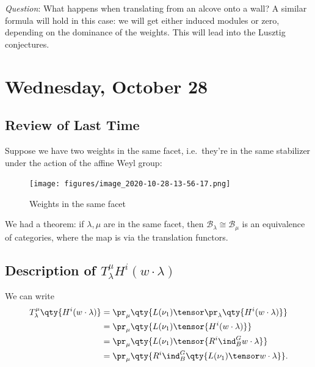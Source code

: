 \emph{Question}: What happens when translating from an alcove onto a
wall? A similar formula will hold in this case: we will get either
induced modules or zero, depending on the dominance of the weights. This
will lead into the Lusztig conjectures.

\hypertarget{wednesday-october-28}{%
\section{Wednesday, October 28}\label{wednesday-october-28}}

\hypertarget{review-of-last-time}{%
\subsection{Review of Last Time}\label{review-of-last-time}}

Suppose we have two weights in the same facet, i.e.~they're in the same
stabilizer under the action of the affine Weyl group:

\begin{figure}
\centering
\texttt{[image: figures/image\_2020-10-28-13-56-17.png]}
\caption{Weights in the same facet}
\end{figure}

We had a theorem: if \(\lambda, \mu\) are in the same facet, then
\(\mathcal{B}_\lambda \cong \mathcal{B}_\mu\) is an equivalence of
categories, where the map is via the translation functors.

\hypertarget{description-of-t_lambdamu-hiwcdot-lambda}{%
\subsection{\texorpdfstring{Description of
\(T_\lambda^\mu {H^i(w\cdot \lambda) }\)}{Description of T\_\textbackslash lambda\^{}\textbackslash mu \{H\^{}i(w\textbackslash cdot \textbackslash lambda) \}}}\label{description-of-t_lambdamu-hiwcdot-lambda}}

We can write
\begin{align*}  
T_\lambda^\mu \qty{H^i(w\cdot \lambda)} 
&= \pr_\mu \qty{L(\nu_1) \tensor \pr_\lambda\qty{H^i(w\cdot \lambda)} } \\
&= \pr_\mu \qty{L(\nu_1) \tensor {H^i(w\cdot \lambda)} } \\
&= \pr_\mu \qty{L(\nu_1) \tensor {R^i \ind_B^G w\cdot \lambda} } \\
&= \pr_\mu\qty{R^i \ind_B^G \qty{L(\nu_1) \tensor w\cdot \lambda } }
.\end{align*}

